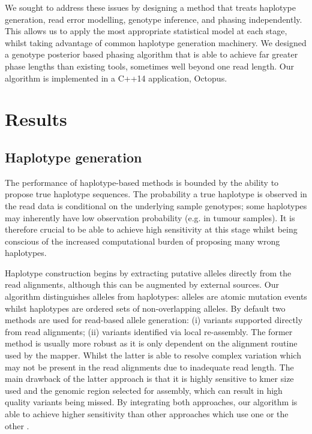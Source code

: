 \documentclass[notitlepage, twocolumn]{article}
\begin{document}
We sought to address these issues by designing a method that treats haplotype generation, read error modelling, genotype inference, and phasing independently. This allows us to apply the most appropriate statistical model at each stage, whilst taking advantage of common haplotype generation machinery. We designed a genotype posterior based phasing algorithm that is able to achieve far greater phase lengths than existing tools, sometimes well beyond one read length. Our algorithm is implemented in a C++14 application, Octopus.

\section*{Results}

\subsection*{Haplotype generation}

The performance of haplotype-based methods is bounded by the ability to propose true haplotype sequences. The probability a true haplotype is observed in the read data is conditional on the underlying sample genotypes; some haplotypes may inherently have low observation probability (e.g. in tumour samples). It is therefore crucial to be able to achieve high sensitivity at this stage whilst being conscious of the increased computational burden of proposing many wrong haplotypes.

Haplotype construction begins by extracting putative alleles directly from the read alignments, although this can be augmented by external sources. Our algorithm distinguishes alleles from haplotypes: alleles are atomic mutation events whilst haplotypes are ordered sets of non-overlapping alleles. By default two methods are used for read-based allele generation: (i) variants supported directly from read alignments; (ii) variants identified via local re-assembly. The former method is usually more robust as it is only dependent on the alignment routine used by the mapper. Whilst the latter is able to resolve complex variation which may not be present in the read alignments due to inadequate read length. The main drawback of the latter approach is that it is highly sensitive to kmer size used and the genomic region selected for assembly, which can result in high quality variants being missed. By integrating both approaches, our algorithm is able to achieve higher sensitivity than other approaches which use one or the other \cite{gatk, freebayes}.
\end{document}

